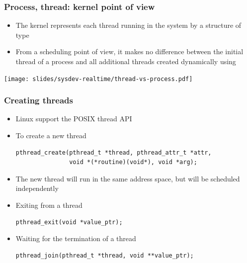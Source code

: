 \begin{frame}
  \frametitle{Process, thread: kernel point of view}
  \begin{itemize}
  \item The kernel represents each thread running in the system by a structure of
    type 
  \item From a scheduling point of view, it makes no difference
    between the initial thread of a process and all additional threads
    created dynamically using 
  \end{itemize}
  \begin{center}
    \texttt{[image: slides/sysdev-realtime/thread-vs-process.pdf]}
  \end{center}
\end{frame}

\begin{frame}[fragile]
  \frametitle{Creating threads}
  \begin{itemize}
  \item Linux support the POSIX thread API
  \item To create a new thread
    \begin{block}{}
\small
\begin{verbatim}
pthread_create(pthread_t *thread, pthread_attr_t *attr,
               void *(*routine)(void*), void *arg);
\end{verbatim}
\normalsize
    \end{block}
  \item The new thread will run in the same address space, but will be
    scheduled independently
  \item Exiting from a thread
    \begin{block}{}
\small
\begin{verbatim}
pthread_exit(void *value_ptr);
\end{verbatim}
\normalsize
    \end{block}
  \item Waiting for the termination of a thread
    \begin{block}{}
\small
\begin{verbatim}
pthread_join(pthread_t *thread, void **value_ptr);
\end{verbatim}
\normalsize
    \end{block}
  \end{itemize}
\end{frame}

